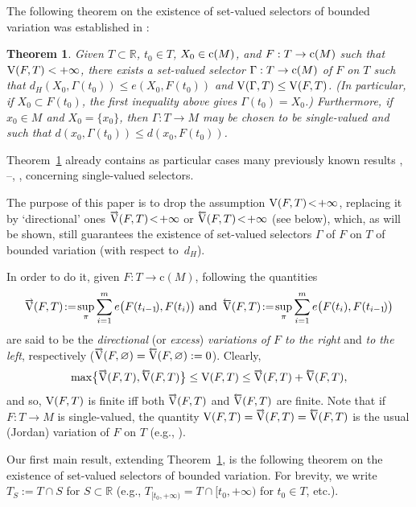 \documentclass[preprint,12pt]{elsarticle}
\newtheorem{thrm}{Theorem}
\newcommand{\Rb}{\mathbb{R}}  \newcommand{\Nb}{\mathbb{N}}
\newcommand{\es}{\varnothing}
\newcommand{\nV}{\mbox{\rm V}}
\newcommand{\riV}{{\scriptstyle\overrightarrow{\mbox{\rm V}}}}
\newcommand{\leV}{{\scriptstyle\overleftarrow{\mbox{\rm V}}}}
\begin{document}
The following theorem on the existence of set-valued selectors of bounded variation
was established in \cite[Theorems~10.1 and~5.1]{Sovae}:

\begin{thrm} \label{t:A}
Given $T\subset\Rb$, $t_0\in T$, $X_0\in\mbox{\rm c}(M)$, and
$F:T\to\mbox{\rm c}(M)$ such that $\nV(F,T)<+\infty$, there exists
a set-valued selector $\Gamma:T\to\mbox{\rm c}(M)$ of $F$ on $T$ such that
$d_H(X_0,\Gamma(t_0))\le e(X_0,F(t_0))$ and\/ $\nV(\Gamma,T)\le\nV(F,T)$.
{\rm(}In particular, if $X_0\subset F(t_0)$, the first inequality above gives
$\Gamma(t_0)=X_0$.{\rm)} Furthermore, if $x_0\in M$ and $X_0=\{x_0\}$,
then $\Gamma:T\to M$ may be chosen to be single-valued
and such that $d(x_0,\Gamma(t_0))\le d(x_0,F(t_0))$.
\end{thrm}

Theorem~\ref{t:A} already contains as particular cases many previously known results
\cite{JMAA}, \cite{JDCS}--\cite{MZ}, \cite{Studia,GurKos,Hermes,Mor,Slezak},
concerning single-valued selectors.

The purpose of this paper is to drop the assumption $\nV(F,T)\!<\!+\infty$, replacing it by
`directional' ones $\riV(F,T)\!<\!+\infty$ or $\leV(F,T)\!<\!+\infty$ (see below), which,
as will be shown, still guarantees the existence of set-valued selectors $\Gamma$ of $F$
on $T$ of bounded variation (with respect to~$d_H$).

In order to do it, given $F:T\to\mbox{c}(M)$, following \cite{JMAA07} the quantities
  \begin{equation*}
\riV(F,T)\!:=\!\sup_\pi\sum_{i=1}^m e\bigl(F(t_{i-1}\!),F(t_i)\bigr)
\mbox{ and \,}
\leV(F,T)\!:=\!\sup_\pi\sum_{i=1}^m e\bigl(F(t_i),F(t_{i-1}\!)\bigr)
  \end{equation*}
are said to be the \emph{directional\/} (or \emph{excess\/}) \emph{variations of $F$
to the right\/} and \emph{to the left}, respectively ($\riV(F,\es)=\leV(F,\es):=0$). Clearly,
  \begin{equation*}
\max\bigl\{\riV(F,T),\leV(F,T)\bigr\}\le\nV(F,T)\le\riV(F,T)+\leV(F,T),
  \end{equation*}
and so, $\nV(F,T)$ is finite iff both $\riV(F,T)$ and $\leV(F,T)$ are finite.
Note that if $F:T\to M$ is single-valued, the quantity $\nV(F,T)=\riV(F,T)=\leV(F,T)$ 
is the usual (Jordan) variation of $F$ on $T$ (e.g., \cite{MatSb}).

Our first main result, extending Theorem~\ref{t:A}, is the following theorem
on the existence of set-valued selectors of bounded variation.
For brevity, we write $T_S:=T\cap S$ for $S\subset\Rb$ (e.g.,
$T_{[t_0,+\infty)}=T\cap[t_0,+\infty)$ for $t_0\in T$, etc.).
\end{document}
